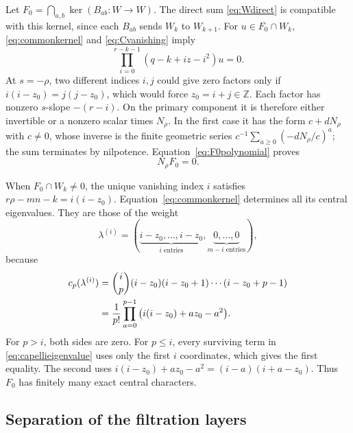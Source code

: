 \documentclass[11pt,a4paper]{article}
\numberwithin{equation}{section}
\theoremstyle{definition}
\newcommand{\Z}{\mathbb Z}
\begin{document}
Let $F_0=\bigcap_{a,b}\ker(B_{ab}:W\to W)$. The direct sum
\eqref{eq:Wdirect} is compatible with this kernel, since each
$B_{ab}$ sends $W_k$ to $W_{k+1}$. For $u\in F_0\cap W_k$,
\eqref{eq:commonkernel} and \eqref{eq:Cvanishing} imply
\begin{equation}\label{eq:F0polynomial}
\prod_{i=0}^{r-k-1}(q-k+iz-i^2)u=0.
\end{equation}
At $s=-\rho$, two different indices $i,j$ could give zero factors
only if $i(i-z_0)=j(j-z_0)$, which would force $z_0=i+j\in\Z$.
Each factor has nonzero $s$-slope $-(r-i)$. On the primary component
it is therefore either invertible or a nonzero scalar times
$N_\rho$. In the first case it has the form $c+dN_\rho$ with
$c\ne0$, whose inverse is the finite geometric series
$c^{-1}\sum_{a\ge0}(-dN_\rho/c)^a$; the sum terminates by nilpotence.
Equation~\eqref{eq:F0polynomial} proves
\begin{equation}\label{eq:NF0}
N_\rho F_0=0.
\end{equation}

When $F_0\cap W_k\ne0$, the unique vanishing index $i$ satisfies
$r\rho-mn-k=i(i-z_0)$. Equation~\eqref{eq:commonkernel} determines all its
central eigenvalues. They are those of the weight
\[
\lambda^{(i)}=(\underbrace{i-z_0,\ldots,i-z_0}_{i\text{ entries}},
                         \underbrace{0,\ldots,0}_{m-i\text{ entries}}),
\]
because
\begin{align}
c_p(\lambda^{(i)})
 &=\binom ip(i-z_0)(i-z_0+1)\cdots(i-z_0+p-1)\notag\\
 &=\frac1{p!}\prod_{a=0}^{p-1}\big(i(i-z_0)+az_0-a^2\big).
\label{eq:rectangle}
\end{align}
For $p>i$, both sides are zero. For $p\le i$, every surviving term
in \eqref{eq:capellieigenvalue} uses only the first $i$ coordinates,
which gives the first equality. The second uses
$i(i-z_0)+az_0-a^2=(i-a)(i+a-z_0)$.
Thus $F_0$ has finitely many exact central characters.

\subsection{Separation of the filtration layers}\label{subsec:separation}
\end{document}
